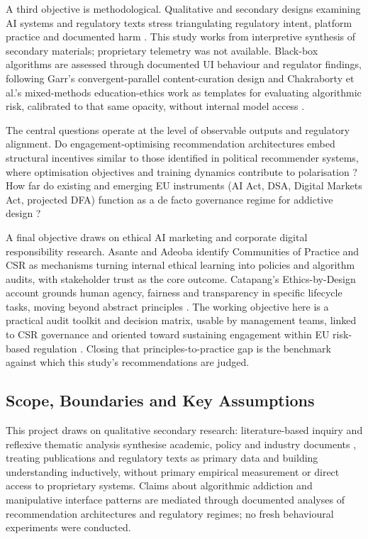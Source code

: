\documentclass[11pt]{article}
\begin{document}
A third objective is methodological. Qualitative and secondary designs examining AI systems and regulatory texts stress triangulating regulatory intent, platform practice and documented harm \parencites[7]{6295677}[6]{6502223}[3]{5142478}. This study works from interpretive synthesis of secondary materials; proprietary telemetry was not available. Black-box algorithms are assessed through documented UI behaviour and regulator findings, following Garr's convergent-parallel content-curation design and Chakraborty et al.'s mixed-methods education-ethics work as templates for evaluating algorithmic risk, calibrated to that same opacity, without internal model access \parencites[3]{5142478}[5]{1308731}.

The central questions operate at the level of observable outputs and regulatory alignment. Do engagement-optimising recommendation architectures embed structural incentives similar to those identified in political recommender systems, where optimisation objectives and training dynamics contribute to polarisation \parencites[6]{6502223}? How far do existing and emerging EU instruments (AI Act, DSA, Digital Markets Act, projected DFA) function as a de facto governance regime for addictive design \parencites[390]{7896734}[2248]{6502223}[2]{1456534}?

A final objective draws on ethical AI marketing and corporate digital responsibility research. Asante and Adeoba \parencites[11]{8200246}[16]{8200246} identify Communities of Practice and CSR as mechanisms turning internal ethical learning into policies and algorithm audits, with stakeholder trust as the core outcome. Catapang's Ethics-by-Design account grounds human agency, fairness and transparency in specific lifecycle tasks, moving beyond abstract principles \parencites[12]{8367105}. The working objective here is a practical audit toolkit and decision matrix, usable by management teams, linked to CSR governance and oriented toward sustaining engagement within EU risk-based regulation \parencites[11]{8200246}[12]{8367105}[4]{1456534}. Closing that principles-to-practice gap is the benchmark against which this study's recommendations are judged.

\subsection{Scope, Boundaries and Key Assumptions}
\label{sec:scope_boundaries_assumptions} This project draws on qualitative secondary research: literature-based inquiry and reflexive thematic analysis synthesise academic, policy and industry documents \parencites[8]{8200246}[6]{6502223}, treating publications and regulatory texts as primary data and building understanding inductively, without primary empirical measurement or direct access to proprietary systems. Claims about algorithmic addiction and manipulative interface patterns are mediated through documented analyses of recommendation architectures and regulatory regimes; no fresh behavioural experiments were conducted.
\end{document}
